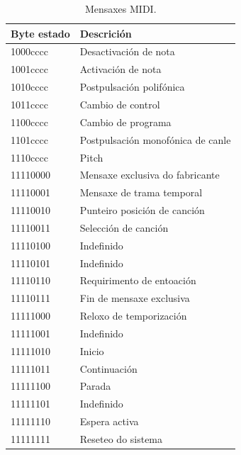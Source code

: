     \begin{table}[!hbt]
     \centering
     \begin{tabular}{|l|l|}
      \hline
      \textbf{Byte estado} & \textbf{Descrición} \\
      \hline
      1000cccc & Desactivación de nota \\
      \hline
      1001cccc & Activación de nota \\
      \hline
      1010cccc & Postpulsación polifónica \\
      \hline
      1011cccc & Cambio de control \\
      \hline
      1100cccc & Cambio de programa \\
      \hline
      1101cccc & Postpulsación monofónica de canle \\
      \hline
      1110cccc & Pitch \\
      \hline
      11110000 & Mensaxe exclusiva do fabricante \\
      \hline
      11110001 & Mensaxe de trama temporal \\
      \hline
      11110010 & Punteiro posición de canción \\
      \hline
      11110011 & Selección de canción \\
      \hline
      11110100 & Indefinido \\
      \hline
      11110101 & Indefinido \\
      \hline
      11110110 & Requirimento de entoación \\
      \hline
      11110111 & Fin de mensaxe exclusiva \\
      \hline
      11111000 & Reloxo de temporización \\
      \hline
      11111001 & Indefinido \\
      \hline
      11111010 & Inicio \\
      \hline
      11111011 & Continuación \\
      \hline
      11111100 & Parada \\
      \hline
      11111101 & Indefinido \\
      \hline
      11111110 & Espera activa \\
      \hline
      11111111 & Reseteo do sistema \\
      \hline
     \end{tabular}
     \caption{Mensaxes MIDI.}
     \label{tabla:WikipediaMensaxesMIDI}  
    \end{table}
  
